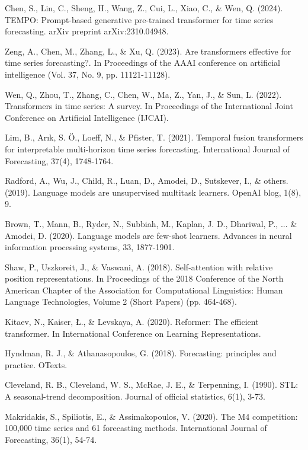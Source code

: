 \documentclass[11pt]{article}
\begin{document}
\begin{thebibliography}{99}
Chen, S., Lin, C., Sheng, H., Wang, Z., Cui, L., Xiao, C., \& Wen, Q. (2024). TEMPO: Prompt-based generative pre-trained transformer for time series forecasting. arXiv preprint arXiv:2310.04948.

Zeng, A., Chen, M., Zhang, L., \& Xu, Q. (2023). Are transformers effective for time series forecasting?. In Proceedings of the AAAI conference on artificial intelligence (Vol. 37, No. 9, pp. 11121-11128).

Wen, Q., Zhou, T., Zhang, C., Chen, W., Ma, Z., Yan, J., \& Sun, L. (2022). Transformers in time series: A survey. In Proceedings of the International Joint Conference on Artificial Intelligence (IJCAI).

Lim, B., Arık, S. Ö., Loeff, N., \& Pfister, T. (2021). Temporal fusion transformers for interpretable multi-horizon time series forecasting. International Journal of Forecasting, 37(4), 1748-1764.

Radford, A., Wu, J., Child, R., Luan, D., Amodei, D., Sutskever, I., \& others. (2019). Language models are unsupervised multitask learners. OpenAI blog, 1(8), 9.

Brown, T., Mann, B., Ryder, N., Subbiah, M., Kaplan, J. D., Dhariwal, P., ... \& Amodei, D. (2020). Language models are few-shot learners. Advances in neural information processing systems, 33, 1877-1901.

Shaw, P., Uszkoreit, J., \& Vaswani, A. (2018). Self-attention with relative position representations. In Proceedings of the 2018 Conference of the North American Chapter of the Association for Computational Linguistics: Human Language Technologies, Volume 2 (Short Papers) (pp. 464-468).

Kitaev, N., Kaiser, Ł., \& Levskaya, A. (2020). Reformer: The efficient transformer. In International Conference on Learning Representations.

Hyndman, R. J., \& Athanasopoulos, G. (2018). Forecasting: principles and practice. OTexts.

Cleveland, R. B., Cleveland, W. S., McRae, J. E., \& Terpenning, I. (1990). STL: A seasonal-trend decomposition. Journal of official statistics, 6(1), 3-73.

Makridakis, S., Spiliotis, E., \& Assimakopoulos, V. (2020). The M4 competition: 100,000 time series and 61 forecasting methods. International Journal of Forecasting, 36(1), 54-74.


\end{thebibliography}
\end{document}
